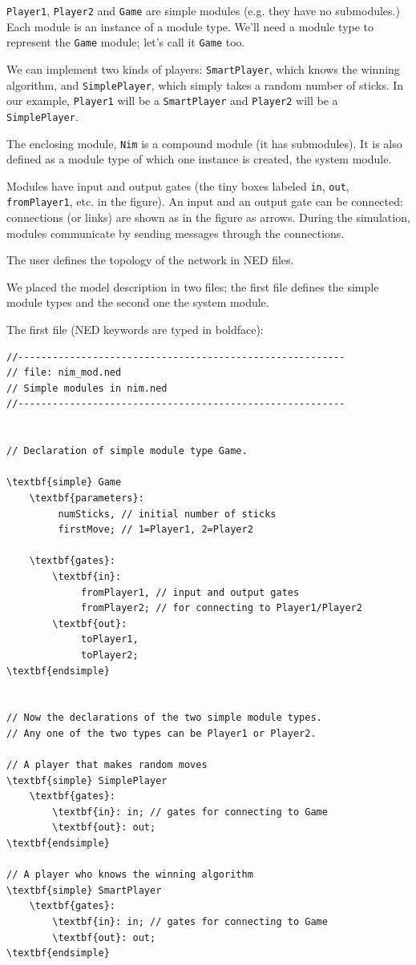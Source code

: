 \texttt{Player1}, \texttt{Player2} and \texttt{Game} are simple
modules (e.g. they have no submodules.) Each module is an instance of
a module type. We'll need a module type to represent the \texttt{Game} module;
let's call it \texttt{Game} too.

We can implement two kinds of players: \texttt{SmartPlayer}, which knows
the winning algorithm, and \texttt{SimplePlayer}, which simply takes a
random number of sticks. In our example, \texttt{Player1} will be a \texttt{SmartPlayer}
and \texttt{Player2} will be a \texttt{SimplePlayer}.

The enclosing module, \texttt{Nim} is a compound module (it has submodules).
It is also defined as a module type of which one instance is
created, the system module.

Modules have input and output gates (the tiny boxes
labeled \texttt{in}, \texttt{out}, \texttt{fromPlayer1}, etc. in the
figure). An input and an output gate can be connected: connections (or
links) are shown as in the figure as arrows.  During the simulation,
modules communicate by sending messages through the connections.


The user defines the topology of the network in NED files.


We placed the model description in two files; the first file
defines the simple module types and the second one the system
module.

The first file (NED keywords are typed in boldface):

\begin{Verbatim}[commandchars=\\\{\}]
//---------------------------------------------------------
// file: nim_mod.ned
// Simple modules in nim.ned
//---------------------------------------------------------


// Declaration of simple module type Game.

\textbf{simple} Game
    \textbf{parameters}:
         numSticks, // initial number of sticks
         firstMove; // 1=Player1, 2=Player2

    \textbf{gates}:
        \textbf{in}:
             fromPlayer1, // input and output gates
             fromPlayer2; // for connecting to Player1/Player2
        \textbf{out}:
             toPlayer1,
             toPlayer2;
\textbf{endsimple}


// Now the declarations of the two simple module types.
// Any one of the two types can be Player1 or Player2.

// A player that makes random moves
\textbf{simple} SimplePlayer
    \textbf{gates}:
        \textbf{in}: in; // gates for connecting to Game
        \textbf{out}: out;
\textbf{endsimple}

// A player who knows the winning algorithm
\textbf{simple} SmartPlayer
    \textbf{gates}:
        \textbf{in}: in; // gates for connecting to Game
        \textbf{out}: out;
\textbf{endsimple}
\end{Verbatim}

